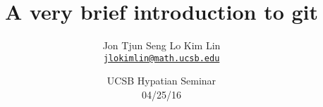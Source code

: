 
%
%

\title{
	\bf A very brief introduction to git
	}

%
%
\author{
	Jon Tjun Seng Lo Kim Lin \\
	\href{mailto:jlokimlin@math.ucsb.edu}{\tt jlokimlin@math.ucsb.edu}
	}

%
%
\date{
	UCSB Hypatian Seminar\\
	04/25/16
	}

\begin{frame}

	\maketitle

\end{frame}
